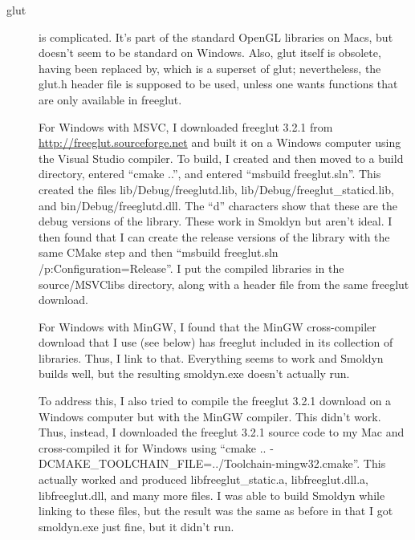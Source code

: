\documentclass {scrbook}
\begin{document}
\begin{description}

\item[glut] is complicated. It's part of the standard OpenGL libraries on Macs, but doesn't seem to be standard on Windows. Also, glut itself is obsolete, having been replaced by, which is a superset of glut; nevertheless, the glut.h header file is supposed to be used, unless one wants functions that are only available in freeglut.

For Windows with MSVC, I downloaded freeglut 3.2.1 from \url{http://freeglut.sourceforge.net} and built it on a Windows computer using the Visual Studio compiler. To build, I created and then moved to a build directory, entered ``cmake ..'', and entered ``msbuild freeglut.sln''. This created the files lib/Debug/freeglutd.lib, lib/Debug/freeglut\_staticd.lib, and bin/Debug/freeglutd.dll. The ``d'' characters show that these are the debug versions of the library. These work in Smoldyn but aren't ideal. I then found that I can create the release versions of the library with the same CMake step and then ``msbuild freeglut.sln /p:Configuration=Release''. I put the compiled libraries in the source/MSVClibs directory, along with a header file from the same freeglut download.

For Windows with MinGW, I found that the MinGW cross-compiler download that I use (see below) has freeglut included in its collection of libraries. Thus, I link to that. Everything seems to work and Smoldyn builds well, but the resulting smoldyn.exe doesn't actually run.

To address this, I also tried to compile the freeglut 3.2.1 download on a Windows computer but with the MinGW compiler. This didn't work. Thus, instead, I downloaded the freeglut 3.2.1 source code to my Mac and cross-compiled it for Windows using ``cmake .. -DCMAKE\_TOOLCHAIN\_FILE=../Toolchain-mingw32.cmake''. This actually worked and produced libfreeglut\_static.a, libfreeglut.dll.a, libfreeglut.dll, and many more files. I was able to build Smoldyn while linking to these files, but the result was the same as before in that I got smoldyn.exe just fine, but it didn't run.


\end{description}
\end{document}
